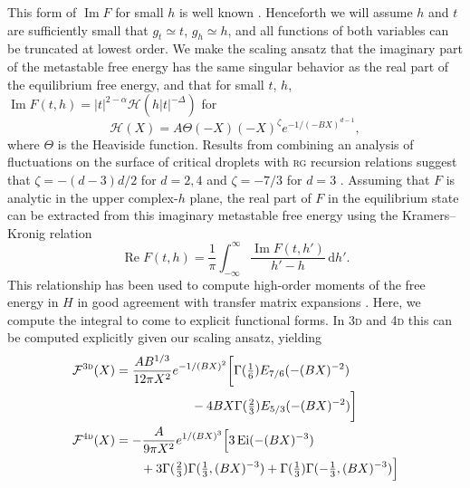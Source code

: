 \documentclass[aps,prl,reprint]{revtex4-1}
\def\[{\begin{equation}}
\def\]{\end{equation}}
\def\re{\mathop{\mathrm{Re}}\nolimits}
\def\im{\mathop{\mathrm{Im}}\nolimits}
\def\dd{\mathrm d}
\def\ei{\mathop{\mathrm{Ei}}\nolimits}
\newif\ifreprint
\begin{document}
This form of $\im F$ for small $h$ is well known
\cite{langer.1967.condensation,harris.1984.metastability}. Henceforth we will
assume $h$ and $t$ are sufficiently small that $g_t\simeq t$, $g_h\simeq h$,
and all functions of both variables can be truncated at lowest order. We make
the scaling ansatz that the imaginary part of the metastable free energy has
the same singular behavior as the real part of the equilibrium free energy,
and that for small $t$, $h$, $\im F(t,h)=|t|^{2-\alpha}\mathcal
H(h|t|^{-\Delta})$ for
\[
  \mathcal H(X)=A\Theta(-X)(-X)^\zeta e^{-1/(-BX)^{d-1}},
  \label{eq:im.scaling}
\]
where $\Theta$ is the Heaviside function. Results from combining an analysis
of fluctuations on the surface of critical droplets with \textsc{rg} recursion
relations suggest that $\zeta=-(d-3)d/2$ for $d=2,4$ and $\zeta=-7/3$ for
$d=3$
\cite{houghton.1980.metastable,rudnick.1976.equations,gunther.1980.goldstone}.
Assuming that $F$ is analytic in the upper complex-$h$ plane, the real part of
$F$ in the equilibrium state can be extracted from this imaginary metastable
free energy using the Kramers--Kronig relation
\[
  \re F(t,h)=\frac1\pi\int_{-\infty}^\infty\frac{\im F(t,h')}{h'-h}\,\dd h'.
\]
This relationship has been used to compute high-order moments of the free
energy in $H$ in good agreement with transfer matrix expansions
\cite{lowe.1980.instantons}. Here, we compute the integral to come to explicit
functional forms.  In \textsc{3d} and \textsc{4d} this can be computed
explicitly given our scaling ansatz, yielding
\def\eqthreedeeone{
  \mathcal F^{\text{\textsc{3d}}}(X)&=
  \frac{AB^{1/3}}{12\pi X^2}e^{-1/(BX)^2}
  \bigg[\Gamma(\tfrac16)E_{7/6}(-(BX)^{-2})
}
\def\eqthreedeetwo{
  -4BX\Gamma(\tfrac23)E_{5/3}(-(BX)^{-2})\bigg]
}
\def\eqfourdeeone{
  \mathcal F^{\text{\textsc{4d}}}(X)&=
  -\frac{A}{9\pi X^2}e^{1/(BX)^3}
  \Big[3\ei(-(BX)^{-3})
}
\def\eqfourdeetwo{
  +3\Gamma(\tfrac23)\Gamma(\tfrac13,(BX)^{-3})
  +\Gamma(\tfrac13)\Gamma(-\tfrac13,(BX)^{-3})\Big]
}
\ifreprint
\begin{align}
  &\begin{aligned}
    \eqthreedeeone\\
    &\hspace{6em}
    \eqthreedeetwo
  \end{aligned}
  \\
  &\begin{aligned}
    \eqfourdeeone
    \\
    &\hspace{2em}
    \eqfourdeetwo
  \end{aligned}
\end{align}
\end{document}
